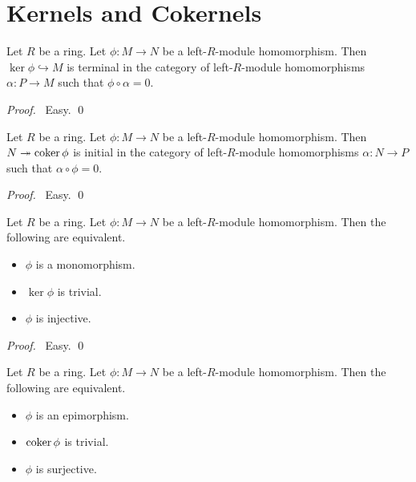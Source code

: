 \section{Kernels and Cokernels}

\begin{prop}
Let $R$ be a ring.
Let $\phi : M \rightarrow N$ be a left-$R$-module homomorphism. Then $\ker \phi \hookrightarrow M$ is terminal in the category of left-$R$-module homomorphisms $\alpha : P \rightarrow M$ such that $\phi \circ \alpha = 0$.
\end{prop}

\begin{proof}
\pf\ Easy. \qed
\end{proof}

\begin{prop}
Let $R$ be a ring.
Let $\phi : M \rightarrow N$ be a left-$R$-module homomorphism. Then $N \twoheadrightarrow \operatorname{coker} \phi$ is initial in the category of left-$R$-module homomorphisms $\alpha : N \rightarrow P$ such that $\alpha \circ \phi = 0$.
\end{prop}

\begin{proof}
\pf\ Easy. \qed
\end{proof}

\begin{prop}
Let $R$ be a ring. Let $\phi : M \rightarrow N$ be a left-$R$-module homomorphism. Then the following are equivalent.
\begin{itemize}
\item $\phi$ is a monomorphism.
\item $\ker \phi$ is trivial.
\item $\phi$ is injective.
\end{itemize}
\end{prop}

\begin{proof}
\pf\ Easy. \qed
\end{proof}

\begin{prop}
Let $R$ be a ring. Let $\phi : M \rightarrow N$ be a left-$R$-module homomorphism. Then the following are equivalent.
\begin{itemize}
\item $\phi$ is an epimorphism.
\item $\operatorname{coker} \phi$ is trivial.
\item $\phi$ is surjective.
\end{itemize}
\end{prop}

